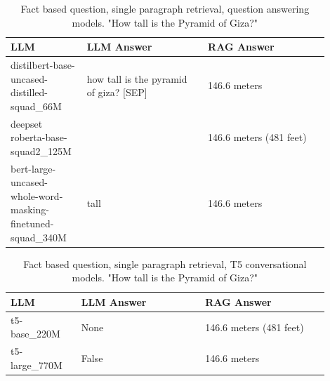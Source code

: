 \documentclass{wseas}
\begin{document}
\begin{table}[htbp]
  \centering
  \caption{Fact based question, single paragraph retrieval, question answering models. "How tall is the Pyramid of Giza?"} %
  \label{tab:experiment_R_1_paragraph_Q_fact_M_QaModels_table}
  \begin{tabular}{|p{0.2\linewidth}|p{0.35\linewidth}|p{0.35\linewidth}|}
    \hline
    \textbf{LLM} & \textbf{LLM Answer} & \textbf{RAG Answer} \\ \hline
    \makecell[l]{distilbert-base-uncased-\\distilled-squad\_66M} & how tall is the pyramid of giza? {[}SEP{]} & 146.6 meters \\ \hline
    \makecell[l]{deepset roberta-base-\\squad2\_125M} &  & 146.6 meters (481 feet) \\ \hline
    \makecell[l]{bert-large-uncased-\\whole-word-masking-\\finetuned-squad\_340M} & tall & 146.6 meters \\ \hline
  \end{tabular}
\end{table}
\begin{table}[htbp]
  \centering
  \caption{Fact based question, single paragraph retrieval, T5 conversational models. "How tall is the Pyramid of Giza?"} %
  \label{tab:experiment_R_1_paragraph_Q_fact_M_T5Models_table}
  \begin{tabular}{|p{0.20\linewidth}|p{0.35\linewidth}|p{0.35\linewidth}|}
    \hline
    \textbf{LLM} & \textbf{LLM Answer} & \textbf{RAG Answer} \\ \hline
    t5-base\_220M & None & 146.6 meters (481 feet) \\ \hline
    t5-large\_770M & False & 146.6 meters \\ \hline
  \end{tabular}
\end{table}
\end{document}
